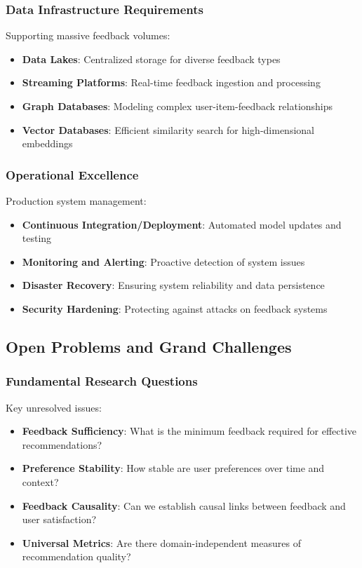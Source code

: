 \subsubsection{Data Infrastructure Requirements}

Supporting massive feedback volumes:

\begin{itemize}
    \item \textbf{Data Lakes}: Centralized storage for diverse feedback types
    \item \textbf{Streaming Platforms}: Real-time feedback ingestion and processing
    \item \textbf{Graph Databases}: Modeling complex user-item-feedback relationships
    \item \textbf{Vector Databases}: Efficient similarity search for high-dimensional embeddings
\end{itemize}

\subsubsection{Operational Excellence}

Production system management:

\begin{itemize}
    \item \textbf{Continuous Integration/Deployment}: Automated model updates and testing
    \item \textbf{Monitoring and Alerting}: Proactive detection of system issues
    \item \textbf{Disaster Recovery}: Ensuring system reliability and data persistence
    \item \textbf{Security Hardening}: Protecting against attacks on feedback systems
\end{itemize}

\subsection{Open Problems and Grand Challenges}

\subsubsection{Fundamental Research Questions}

Key unresolved issues:

\begin{itemize}
    \item \textbf{Feedback Sufficiency}: What is the minimum feedback required for effective recommendations?
    \item \textbf{Preference Stability}: How stable are user preferences over time and context?
    \item \textbf{Feedback Causality}: Can we establish causal links between feedback and user satisfaction?
    \item \textbf{Universal Metrics}: Are there domain-independent measures of recommendation quality?
\end{itemize}

